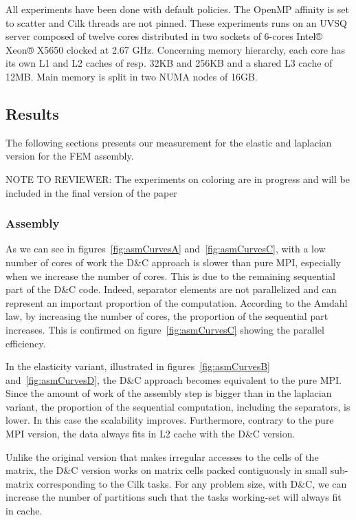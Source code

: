\documentclass{IOS-Book-Article}
\begin{document}
All experiments have been done with default policies. The OpenMP affinity is set to scatter and Cilk threads are not pinned.
These experiments runs on an UVSQ server composed of twelve cores distributed in two sockets of 6-cores Intel® Xeon® X5650 clocked at 2.67 GHz.
Concerning memory hierarchy, each core has its own L1 and L2 caches of resp. 32KB and 256KB and a shared L3 cache of 12MB. Main memory is split in two NUMA nodes of 16GB.

\subsection{Results}

The following sections presents our measurement for the elastic and laplacian version for the FEM assembly. 

NOTE TO REVIEWER: The experiments on coloring are in progress and will be included in the final version of the paper

\subsubsection{Assembly}
As we can see in figures~\ref{fig:asmCurvesA} and~\ref{fig:asmCurvesC}, with a low number of cores of work the D\&C approach is slower than pure MPI, especially when we increase
the number of cores.
This is due to the remaining sequential part of the D\&C code.
Indeed, separator elements are not parallelized and can represent an important proportion of the computation.
According to the Amdahl law, by increasing the number of cores, the proportion of the sequential part increases. This is confirmed on figure~\ref{fig:asmCurvesC} showing the parallel efficiency.

In the elasticity variant, illustrated in figures~\ref{fig:asmCurvesB} and~\ref{fig:asmCurvesD}, the D\&C approach becomes equivalent to the pure MPI.
Since the amount of work of the assembly step is bigger than in the laplacian variant, the proportion of the sequential computation, including the separators, is lower. In this case the scalability improves. Furthermore, contrary to the pure MPI version, the data always fits in L2 cache with the D\&C version.

Unlike the original version that makes irregular accesses to the cells of the matrix, the D\&C version works on matrix cells packed contiguously in small sub-matrix corresponding to the Cilk tasks.
For any problem size, with D\&C, we can increase the number of partitions such that the tasks working-set will always fit in cache.
\end{document}
